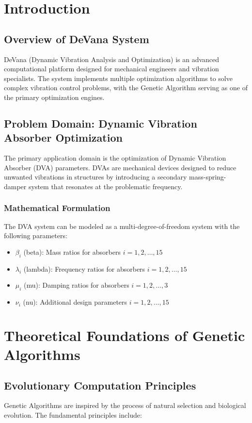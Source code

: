 \documentclass[12pt,a4paper]{article}
\begin{document}
\section{Introduction}

\subsection{Overview of DeVana System}
DeVana (Dynamic Vibration Analysis and Optimization) is an advanced computational platform designed for mechanical engineers and vibration specialists. The system implements multiple optimization algorithms to solve complex vibration control problems, with the Genetic Algorithm serving as one of the primary optimization engines.

\subsection{Problem Domain: Dynamic Vibration Absorber Optimization}
The primary application domain is the optimization of Dynamic Vibration Absorber (DVA) parameters. DVAs are mechanical devices designed to reduce unwanted vibrations in structures by introducing a secondary mass-spring-damper system that resonates at the problematic frequency.

\subsubsection{Mathematical Formulation}
The DVA system can be modeled as a multi-degree-of-freedom system with the following parameters:
\begin{itemize}
    \item $\beta_i$ (beta): Mass ratios for absorbers $i = 1, 2, \ldots, 15$
    \item $\lambda_i$ (lambda): Frequency ratios for absorbers $i = 1, 2, \ldots, 15$
    \item $\mu_i$ (mu): Damping ratios for absorbers $i = 1, 2, \ldots, 3$
    \item $\nu_i$ (nu): Additional design parameters $i = 1, 2, \ldots, 15$
\end{itemize}

\section{Theoretical Foundations of Genetic Algorithms}

\subsection{Evolutionary Computation Principles}
Genetic Algorithms are inspired by the process of natural selection and biological evolution. The fundamental principles include:
\end{document}
